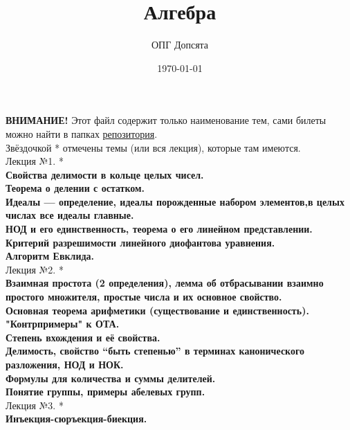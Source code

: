 \documentclass[12pt]{article}
\title{Алгебра}
\author{ОПГ Допсята}
\date{\today}
\begin{document}
\maketitle
\large

\textbf{ВНИМАНИЕ!} Этот файл содержит только наименование тем, сами билеты можно найти в папках \href{https://github.com/Win4ap/algebra-exam-2023}{репозитория}.\\
Звёздочкой * отмечены темы (или вся лекция), которые там имеются.\\

Лекция №1. *\\
\textbf{Свойства делимости в кольце целых чисел.}\\

\textbf{Теорема о делении с остатком.}\\

\textbf{Идеалы — определение, идеалы порожденные набором элементов,в целых числах все идеалы главные.}\\

\textbf{НОД и его единственность, теорема о его линейном представлении.}\\

\textbf{Критерий разрешимости линейного диофантова уравнения.}\\

\textbf{Алгоритм Евклида.}\\

Лекция №2. *\\
\textbf{Взаимная простота (2 определения), лемма об отбрасывании взаимно простого множителя, простые числа и их основное свойство.}\\

\textbf{Основная теорема арифметики (существование и единственность).
"Контрпримеры" к ОТА.}\\

\textbf{Степень вхождения и её свойства.}\\

\textbf{Делимость, свойство “быть степенью” в терминах канонического разложения, НОД и НОК.}\\

\textbf{Формулы для количества и суммы делителей.}\\

\textbf{Понятие группы, примеры абелевых групп.}\\

Лекция №3. *\\
\textbf{Инъекция-сюръекция-биекция.}\\
\end{document}
